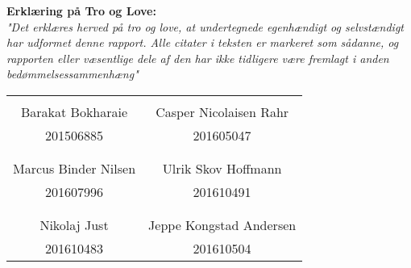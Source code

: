 \documentclass[../Hovedrapport.tex]{subfiles}
\begin{document}
\textbf{Erklæring på Tro og Love:}      \\
\textit{"Det erklæres herved på tro og love, at undertegnede egenhændigt og selvstændigt
har udformet denne rapport. Alle citater i teksten er markeret som sådanne, og
rapporten eller væsentlige dele af den har ikke tidligere være fremlagt i anden
bedømmelsessammenhæng"} \vspace{0.3cm}
\begin{table}[H]
	\centering
		\begin{tabular}{c c}
			\underline{\phantom{mmmmmmmmmmmmmmmmmmm}}       & \underline{\phantom{mmmmmmmmmmmmmmmmmmm}}     \\
			Barakat Bokharaie			                    & Casper Nicolaisen Rahr 		                \\ 
			201506885                                       & 201605047                                     \\ \\
			\underline{\phantom{mmmmmmmmmmmmmmmmmmm}}       & \underline{\phantom{mmmmmmmmmmmmmmmmmmm}}     \\
			Marcus Binder Nilsen			                & Ulrik Skov Hoffmann 		                    \\ 
			201607996                                       & 201610491                                     \\ \\
			\underline{\phantom{mmmmmmmmmmmmmmmmmmm}}       & \underline{\phantom{mmmmmmmmmmmmmmmmmmm}}     \\
			Nikolaj Just			                        & Jeppe Kongstad Andersen         		        \\  
			201610483                                       & 201610504                                     \\  
		\end{tabular}
\end{table}
\end{document}
